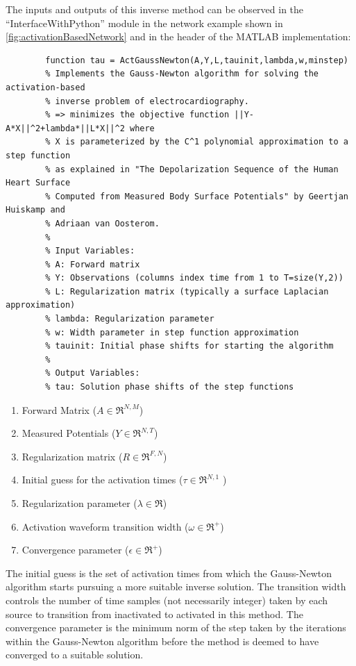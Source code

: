     The inputs and outputs of this inverse method can be observed in the ``InterfaceWithPython'' module in the network example shown in \autoref{fig:activationBasedNetwork} and in the header of the MATLAB implementation:
    \begin{verbatim}
        function tau = ActGaussNewton(A,Y,L,tauinit,lambda,w,minstep)
        % Implements the Gauss-Newton algorithm for solving the activation-based
        % inverse problem of electrocardiography.
        % => minimizes the objective function ||Y-A*X||^2+lambda*||L*X||^2 where
        % X is parameterized by the C^1 polynomial approximation to a step function
        % as explained in "The Depolarization Sequence of the Human Heart Surface
        % Computed from Measured Body Surface Potentials" by Geertjan Huiskamp and
        % Adriaan van Oosterom.
        %
        % Input Variables:
        % A: Forward matrix
        % Y: Observations (columns index time from 1 to T=size(Y,2))
        % L: Regularization matrix (typically a surface Laplacian approximation)
        % lambda: Regularization parameter
        % w: Width parameter in step function approximation
        % tauinit: Initial phase shifts for starting the algorithm
        %
        % Output Variables:
        % tau: Solution phase shifts of the step functions
    \end{verbatim}

    \begin{enumerate}
        \item Forward Matrix ($A\in\Re^{N,M}$)
        \item Measured Potentials ($Y\in\Re^{N,T}$)
        \item Regularization matrix ($R\in\Re^{F,N}$)
        \item Initial guess for the activation times ($\tau\in\Re^{N,1}$ )
        \item Regularization parameter ($\lambda\in\Re$)
        \item Activation waveform transition width ($\omega\in\Re^{+}$)
        \item Convergence parameter ($\epsilon\in\Re^{+}$)
    \end{enumerate}
    The initial guess is the set of activation times from which the Gauss-Newton algorithm starts pursuing a more suitable inverse solution.
    The transition width controls the number of time samples (not necessarily integer) taken by each source to transition from inactivated to activated in this method.
    The convergence parameter is the minimum norm of the step taken by the iterations within the Gauss-Newton algorithm before the method is deemed to have converged to a suitable solution.


